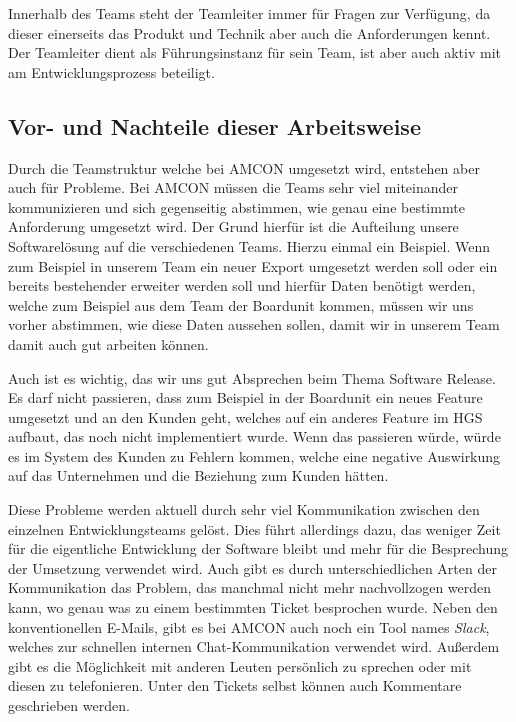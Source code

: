         Innerhalb des Teams steht der Teamleiter immer für Fragen zur Verfügung, da dieser einerseits das Produkt und 
        Technik aber auch die Anforderungen kennt. Der Teamleiter dient als Führungsinstanz für sein Team, ist aber auch
        aktiv mit am Entwicklungsprozess beteiligt.

    \subsection{Vor- und Nachteile dieser Arbeitsweise} \label{VorNachteile}
        Durch die Teamstruktur welche bei AMCON umgesetzt wird, entstehen aber auch für Probleme. Bei AMCON müssen die 
        Teams sehr viel miteinander kommunizieren und sich gegenseitig abstimmen, wie genau eine bestimmte Anforderung 
        umgesetzt wird. Der Grund hierfür ist die Aufteilung unsere Softwarelösung auf die verschiedenen Teams. Hierzu 
        einmal ein Beispiel. Wenn zum Beispiel in unserem Team ein neuer Export umgesetzt werden soll oder ein bereits
        bestehender erweiter werden soll und hierfür Daten benötigt werden, welche zum Beispiel aus dem Team der 
        Boardunit kommen, müssen wir uns vorher abstimmen, wie diese Daten aussehen sollen, damit wir in unserem Team 
        damit auch gut arbeiten können. 
        
        Auch ist es wichtig, das wir uns gut Absprechen beim Thema Software Release. Es darf nicht passieren, dass zum 
        Beispiel in der Boardunit ein neues Feature umgesetzt und an den Kunden geht, welches auf ein anderes Feature im
        HGS aufbaut, das noch nicht implementiert wurde. Wenn das passieren würde, würde es im System des Kunden zu 
        Fehlern kommen, welche eine negative Auswirkung auf das Unternehmen und die Beziehung zum Kunden hätten.

        Diese Probleme werden aktuell durch sehr viel Kommunikation zwischen den einzelnen Entwicklungsteams gelöst. 
        Dies führt allerdings dazu, das weniger Zeit für die eigentliche Entwicklung der Software bleibt und mehr für
        die Besprechung der Umsetzung verwendet wird. Auch gibt es durch unterschiedlichen Arten der Kommunikation
        das Problem, das manchmal nicht mehr nachvollzogen werden kann, wo genau was zu einem bestimmten Ticket 
        besprochen wurde. Neben den konventionellen E-Mails, gibt es bei AMCON auch noch ein Tool names \emph{Slack}, 
        welches zur schnellen internen Chat-Kommunikation verwendet wird. Außerdem gibt es die Möglichkeit mit anderen
        Leuten persönlich zu sprechen oder mit diesen zu telefonieren. Unter den Tickets selbst können auch 
        Kommentare geschrieben werden.

